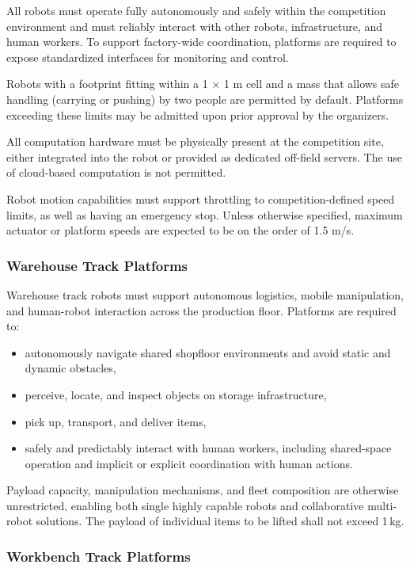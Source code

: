 \documentclass[letterpaper, 11pt]{extarticle}
\begin{document}
All robots must operate fully autonomously and safely within the competition environment and must reliably interact with other robots, infrastructure, and human workers. To support factory-wide coordination, platforms are required to expose standardized interfaces for monitoring and control.

Robots with a footprint fitting within a 1 × 1 m cell and a mass that allows safe handling (carrying or pushing) by two people are permitted by default. Platforms exceeding these limits may be admitted upon prior approval by the organizers.

All computation hardware must be physically present at the competition site, either integrated into the robot or provided as dedicated off-field servers. The use of cloud-based computation is not permitted.

Robot motion capabilities must support throttling to competition-defined speed limits, as well as having an emergency stop. Unless otherwise specified, maximum actuator or platform speeds are expected to be on the order of 1.5 m/s.
\subsubsection{Warehouse Track Platforms}

Warehouse track robots must support autonomous logistics, mobile manipulation, and human-robot interaction across the production floor. Platforms are required to:
\begin{itemize}
    \item autonomously navigate shared shopfloor environments and avoid static and dynamic obstacles,
    \item perceive, locate, and inspect objects on storage infrastructure,
    \item pick up, transport, and deliver items, %
    \item safely and predictably interact with human workers, including shared-space operation and implicit or explicit coordination with human actions.
\end{itemize}

Payload capacity, manipulation mechanisms, and fleet composition are otherwise unrestricted, enabling both single highly capable robots and collaborative multi-robot solutions. 
The payload of individual items to be lifted shall not exceed 1\,kg.

\subsubsection{Workbench Track Platforms}
\end{document}

